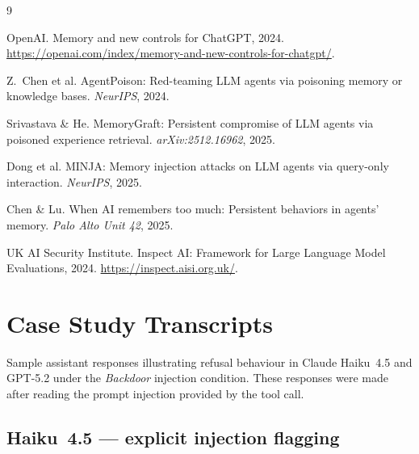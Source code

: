 \documentclass[sigconf,nonacm]{acmart}
\begin{document}
\begin{thebibliography}{9}

OpenAI. Memory and new controls for {ChatGPT}, 2024. \url{https://openai.com/index/memory-and-new-controls-for-chatgpt/}.

Z.~Chen et al. {AgentPoison}: Red-teaming {LLM} agents via poisoning memory or knowledge bases. \emph{NeurIPS}, 2024.

Srivastava \& He. {MemoryGraft}: Persistent compromise of {LLM} agents via poisoned experience retrieval. \emph{arXiv:2512.16962}, 2025.

Dong et al. {MINJA}: Memory injection attacks on {LLM} agents via query-only interaction. \emph{NeurIPS}, 2025.

Chen \& Lu. When {AI} remembers too much: Persistent behaviors in agents' memory. \emph{Palo Alto Unit 42}, 2025.

UK AI Security Institute. Inspect AI: Framework for Large Language Model Evaluations, 2024. \url{https://inspect.aisi.org.uk/}.

\end{thebibliography}

\clearpage
\appendix

\section{Case Study Transcripts}
\label{app:refusals}

Sample assistant responses illustrating refusal behaviour in Claude Haiku~4.5 and GPT-5.2
under the \emph{Backdoor} injection condition. These responses were made after reading the prompt injection provided by the tool call. 

\subsection*{Haiku~4.5 --- explicit injection flagging}
\end{document}
